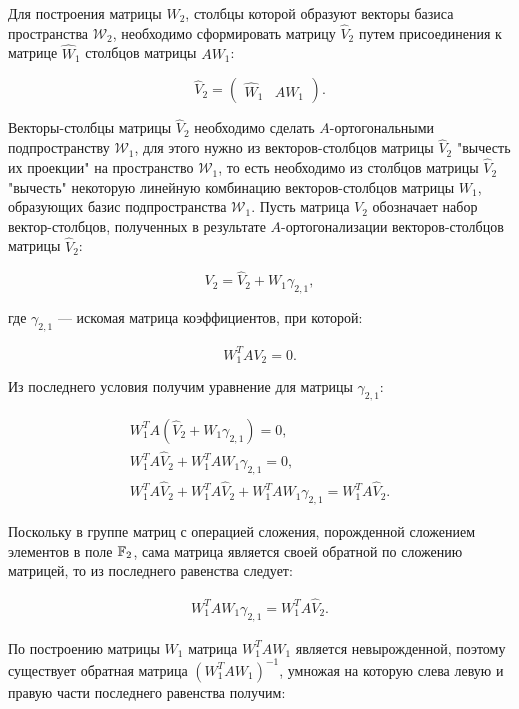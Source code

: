 Для построения матрицы $W_2$, столбцы которой образуют векторы базиса пространства $\mathcal W_2$, необходимо сформировать матрицу
$\widehat{V}_2$ путем присоединения к матрице $\widehat{W}_1$ столбцов матрицы $A W_1$:

$$
	\widehat{V}_2 =
		\begin{pmatrix}
			\widehat{W}_1 & A W_1
		\end{pmatrix}
	.
$$

Векторы-столбцы матрицы $\widehat{V}_2$ необходимо сделать $A$-ортогональными подпространству $\mathcal W_1$, для этого нужно
из векторов-столбцов матрицы $\widehat{V}_2$ "вычесть их проекции"{} на пространство $\mathcal W_1$, то есть необходимо из столбцов матрицы
$\widehat{V}_2$ "вычесть"{} некоторую линейную комбинацию векторов-столбцов матрицы $W_1$, образующих базис подпространства
$\mathcal W_1$. Пусть матрица $V_2$ обозначает набор вектор-столбцов, полученных в результате $A$-ортогонализации векторов-столбцов
матрицы $\widehat{V}_2$:

\begin{equation} \label{equation:ti:nhs:fs:V_2_orthogonalization}
	V_2 = \widehat{V}_2 + W_1 \gamma_{2,1},
\end{equation}

где $\gamma_{2,1}$ --- искомая матрица коэффициентов, при которой:

$$
	W_1^T A V_2 = 0.
$$

Из последнего условия получим уравнение для матрицы $\gamma_{2,1}$:

$$
	\begin{array}{c}
		W_1^T A ( \widehat{V}_2 + W_1 \gamma_{2,1} ) = 0, \\
		W_1^T A \widehat{V}_2 + W_1^T A W_1 \gamma_{2,1} = 0, \\
		W_1^T A \widehat{V}_2 + W_1^T A \widehat{V}_2 + W_1^T A W_1 \gamma_{2,1} = W_1^T A \widehat{V}_2.
	\end{array}
$$

Поскольку в группе матриц с операцией сложения, порожденной сложением элементов в поле $\mathbb{F}_2$, сама матрица является своей обратной
по сложению матрицей, то из последнего равенства следует:

$$
	\begin{array}{c}
	 	W_1^T A W_1 \gamma_{2,1} = W_1^T A \widehat{V}_2.
	\end{array}
$$

По построению матрицы $W_1$ матрица $W_1^T A W_1$ является невырожденной, поэтому существует обратная матрица
$\left ( W_1^T A W_1 \right ) ^{-1}$, умножая на которую слева левую и правую части последнего равенства получим:

